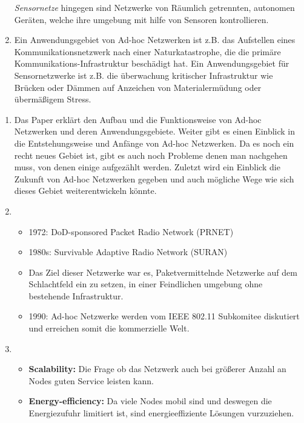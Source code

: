 \begin{enumerate}[label=\arabic*)]
        \emph{Sensornetze} hingegen sind Netzwerke von Räumlich getrennten, autonomen Geräten, welche ihre umgebung mit hilfe von Sensoren kontrollieren. 

        \item Ein Anwendungsgebiet von Ad-hoc Netzwerken ist z.B. das Aufstellen eines Kommunikationsnetzwerk nach einer Naturkatastrophe, die die primäre Kommunikations-Infrastruktur beschädigt hat. Ein Anwendungsgebiet für Sensornetzwerke ist z.B. die überwachung kritischer Infrastruktur wie Brücken oder Dämmen auf Anzeichen von Materialermüdung oder übermäßigem Stress.
    \end{enumerate}

    \begin{enumerate}[label=\arabic*)]
        \item Das Paper erklärt den Aufbau und die Funktionsweise von Ad-hoc Netzwerken und deren Anwendungsgebiete. Weiter gibt es einen Einblick in die Entstehungsweise und Anfänge von Ad-hoc Netzwerken. Da es noch ein recht neues Gebiet ist, gibt es auch noch Probleme denen man nachgehen muss, von denen einige aufgezählt werden. Zuletzt wird ein Einblick die Zukunft von Ad-hoc Netzwerken gegeben und auch mögliche Wege wie sich dieses Gebiet weiterentwickeln könnte.
        \pagebreak
        \item \begin{itemize}
            \item 1972: DoD-sponsored Packet Radio Network (PRNET)
            \item 1980s: Survivable Adaptive Radio Network (SURAN)
            \item Das Ziel dieser Netzwerke war es, Paketvermittelnde Netzwerke auf dem Schlachtfeld ein zu setzen, in einer Feindlichen umgebung ohne bestehende Infrastruktur.
            \item 1990: Ad-hoc Netzwerke werden vom IEEE 802.11 Subkomitee diskutiert und erreichen somit die kommerzielle Welt. 
        \end{itemize}
        
        \item \begin{itemize}
            \item \textbf{Scalability:} Die Frage ob das Netzwerk auch bei größerer Anzahl an Nodes guten Service leisten kann.
            
            \item \textbf{Energy-efficiency:} Da viele Nodes mobil sind und deswegen die Energiezufuhr limitiert ist, sind energieeffiziente Lösungen vurzuziehen.
            

\end{itemize}
\end{enumerate}
